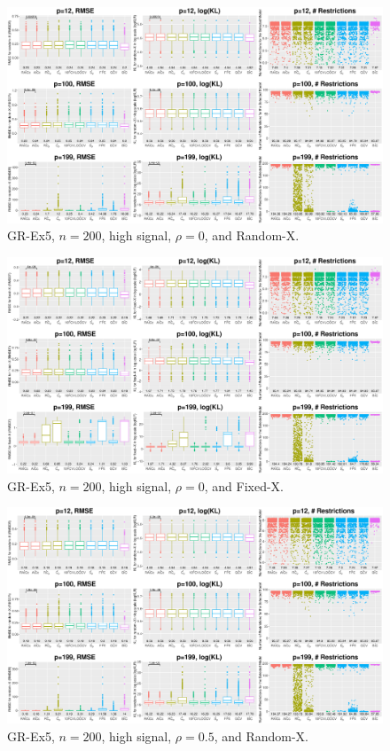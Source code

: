 \clearpage
\begin{figure}[!ht]
\centering
\includegraphics[width=\textwidth]{figures/supplement/randomx_GR-Ex5_n200_hsnr_rho0.eps}
\caption{GR-Ex5, $n=200$, high signal, $\rho=0$, and Random-X.}
\end{figure}
\begin{figure}[!ht]
\centering
\includegraphics[width=\textwidth]{figures/supplement/fixedx_GR-Ex5_n200_hsnr_rho0.eps}
\caption{GR-Ex5, $n=200$, high signal, $\rho=0$, and Fixed-X.}
\end{figure}
\clearpage
\begin{figure}[!ht]
\centering
\includegraphics[width=\textwidth]{figures/supplement/randomx_GR-Ex5_n200_hsnr_rho05.eps}
\caption{GR-Ex5, $n=200$, high signal, $\rho=0.5$, and Random-X.}
\end{figure}
